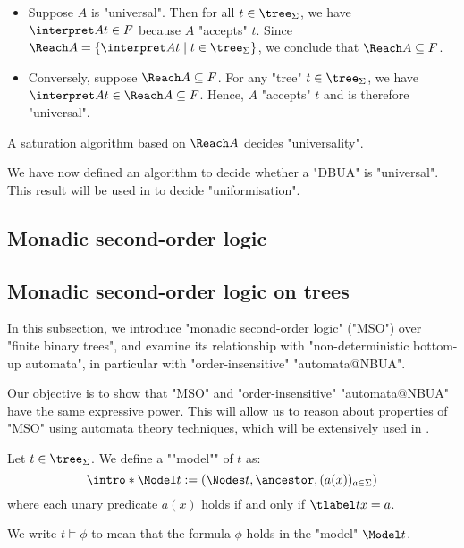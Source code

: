 \documentclass[a4paper,UKenglish,cleveref, autoref, thm-restate]{lipics-v2021}
\begin{document}
\begin{proofI}
	\begin{itemize}
		\item Suppose $A$ is "universal". Then for all $t \in \tree_\Sigma$, we have $\interpret A t \in F$ because $A$ "accepts" $t$.
		      Since $\Reach A = \setdef {\interpret A t} {t \in \tree_\Sigma}$, we conclude that $\Reach A \subseteq F$.

		\item Conversely, suppose $\Reach A \subseteq F$. For any "tree" $t \in \tree_\Sigma$, we have $\interpret A t \in \Reach A \subseteq F$.
		      Hence, $A$ "accepts" $t$ and is therefore "universal".
	\end{itemize}
\end{proofI}

\begin{coro}\label{coro:univeral-Reach}
	A saturation algorithm based on $\Reach A$ decides "universality".
\end{coro}

We have now defined an algorithm to decide whether a "DBUA" is "universal".
This result will be used in  to decide "uniformisation".

\subsection{Monadic second-order logic}\label{sec:MSO}



\subsection{Monadic second-order logic on trees}

In this subsection, we introduce "monadic second-order logic" ("MSO") over "finite binary trees", and examine its relationship with
"non-deterministic bottom-up automata", in particular with "order-insensitive" "automata@NBUA".

Our objective is to show that "MSO" and "order-insensitive" "automata@NBUA" have the same expressive power. This will allow us to reason about properties
of "MSO" using automata theory techniques, which will be extensively used in .

\begin{definition}
	\AP Let $t \in \tree_{\Sigma}$. We define a ""model"" of $t$ as:
	\[
		\intro* \Model t := (\Nodes t, \ancestor , (a (x))_{a \in \Sigma})
	\]
	where each unary predicate $a(x)$ holds if and only if $\tlabel t x = a $.

	We write $t \models \phi$ to mean that the formula $\phi$ holds in the "model" $\Model t$.
\end{definition}
\end{document}
